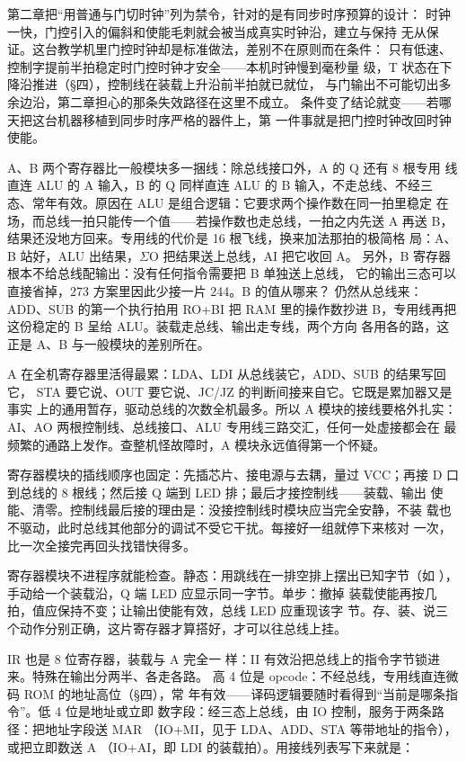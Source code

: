 \begin{warningbox}
第二章把“用普通与门切时钟”列为禁令，针对的是有同步时序预算的设计：
时钟一快，门控引入的偏斜和使能毛刺就会被当成真实时钟沿，建立与保持
无从保证。这台教学机里门控时钟却是标准做法，差别不在原则而在条件：
只有低速、控制字提前半拍稳定时门控时钟才安全——本机时钟慢到毫秒量
级，T 状态在下降沿推进（§四），控制线在装载上升沿前半拍就已就位，
与门输出不可能切出多余边沿，第二章担心的那条失效路径在这里不成立。
条件变了结论就变——若哪天把这台机器移植到同步时序严格的器件上，第
一件事就是把门控时钟改回时钟使能。
\end{warningbox}

A、B 两个寄存器比一般模块多一捆线：除总线接口外，A 的 Q 还有 8 根专用
线直连 ALU 的 A 输入，B 的 Q 同样直连 ALU 的 B 输入，不走总线、不经三
态、常年有效。原因在 ALU 是组合逻辑：它要求两个操作数在同一拍里稳定
在场，而总线一拍只能传一个值——若操作数也走总线，一拍之内先送 A 再送
B，结果还没地方回来。专用线的代价是 16 根飞线，换来加法那拍的极简格
局：A、B 站好，ALU 出结果，$\Sigma$O 把结果送上总线，AI 把它收回 A。
另外，B 寄存器根本不给总线配输出：没有任何指令需要把 B 单独送上总线，
它的输出三态可以直接省掉，273 方案里因此少接一片 244。B 的值从哪来？
仍然从总线来：ADD、SUB 的第一个执行拍用 RO+BI 把 RAM 里的操作数抄进
B，专用线再把这份稳定的 B 呈给 ALU。装载走总线、输出走专线，两个方向
各用各的路，这正是 A、B 与一般模块的差别所在。

A 在全机寄存器里活得最累：LDA、LDI 从总线装它，ADD、SUB 的结果写回它，
STA 要它说、OUT 要它说、JC/JZ 的判断间接来自它。它既是累加器又是事实
上的通用暂存，驱动总线的次数全机最多。所以 A 模块的接线要格外扎实：
AI、AO 两根控制线、总线接口、ALU 专用线三路交汇，任何一处虚接都会在
最频繁的通路上发作。查整机怪故障时，A 模块永远值得第一个怀疑。

寄存器模块的插线顺序也固定：先插芯片、接电源与去耦，量过 VCC；再接 D
口到总线的 8 根线；然后接 Q 端到 LED 排；最后才接控制线——装载、输出
使能、清零。控制线最后接的理由是：没接控制线时模块应当完全安静，不装
载也不驱动，此时总线其他部分的调试不受它干扰。每接好一组就停下来核对
一次，比一次全接完再回头找错快得多。

寄存器模块不进程序就能检查。静态：用跳线在一排空排上摆出已知字节（如
），手动给一个装载沿，Q 端 LED 应显示同一字节。单步：撤掉
装载使能再按几拍，值应保持不变；让输出使能有效，总线 LED 应重现该字
节。存、装、说三个动作分别正确，这片寄存器才算搭好，才可以往总线上挂。

IR 也是 8 位寄存器，装载与 A 完全一
样：II 有效沿把总线上的指令字节锁进来。特殊在输出分两半、各走各路。
高 4 位是 opcode：不经总线，专用线直连微码 ROM 的地址高位（§四），常
年有效——译码逻辑要随时看得到“当前是哪条指令”。低 4 位是地址或立即
数字段：经三态上总线，由 IO 控制，服务于两条路径：把地址字段送 MAR
（IO+MI，见于 LDA、ADD、STA 等带地址的指令），或把立即数送 A
（IO+AI，即 LDI 的装载拍）。用接线列表写下来就是：

